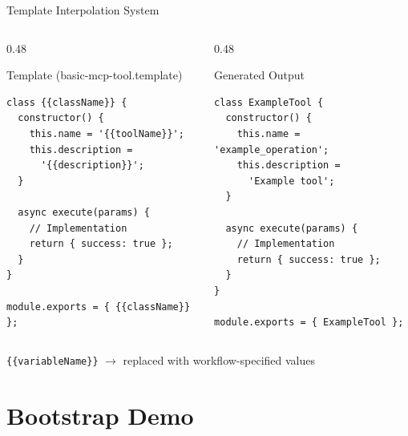 \documentclass[aspectratio=169]{beamer}
\begin{document}
\begin{frame}[fragile]{Template Interpolation System}
\begin{columns}[T]
\begin{column}{0.48\textwidth}
\begin{block}{Template (basic-mcp-tool.template)}
\begin{lstlisting}
class {{className}} {
  constructor() {
    this.name = '{{toolName}}';
    this.description = 
      '{{description}}';
  }
  
  async execute(params) {
    // Implementation
    return { success: true };
  }
}

module.exports = { {{className}} };
\end{lstlisting}
\end{block}
\end{column}

\begin{column}{0.48\textwidth}
\begin{block}{Generated Output}
\begin{lstlisting}
class ExampleTool {
  constructor() {
    this.name = 'example_operation';
    this.description = 
      'Example tool';
  }
  
  async execute(params) {
    // Implementation
    return { success: true };
  }
}

module.exports = { ExampleTool };
\end{lstlisting}
\end{block}
\end{column}
\end{columns}

\vspace{0.3em}
\begin{center}
\texttt{\{\{variableName\}\}} $\rightarrow$ replaced with workflow-specified values
\end{center}
\end{frame}

\section{Bootstrap Demo}
\end{document}
